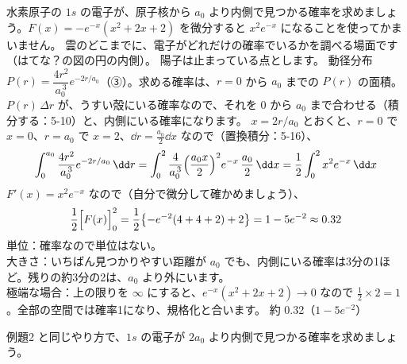\label{ph:原-7:ex2}
\begin{phreidai}
水素原子の $1s$ の電子が、原子核から $a_0$ より内側で見つかる確率を求めましょう。$F(x)=-e^{-x}(x^2+2x+2)$ を微分すると $x^2e^{-x}$ になることを使ってかまいません。
\phbamen
雲のどこまでに、電子がどれだけの確率でいるかを調べる場面です（はてな？の図の円の内側）。
\phmushi
陽子は止まっている点とします。
\phzu
動径分布 $P(r)=\dfrac{4r^2}{a_0^{\,3}}e^{-2r/a_0}$（③）。求める確率は、$r=0$ から $a_0$ までの $P(r)$ の面積。
\phriyu
$P(r)\,\Delta r$ が、うすい殻にいる確率なので、それを $0$ から $a_0$ まで合わせる（積分する：5-10）と、内側にいる確率になります。
\phtateru
$x=2r/a_0$ とおくと、$r=0$ で $x=0$、$r=a_0$ で $x=2$、$\dd r=\tfrac{a_0}{2}\dd x$ なので（置換積分：5-16）、
\[ \int_0^{a_0}\frac{4r^2}{a_0^{\,3}}e^{-2r/a_0}\,\dd r=\int_0^{2}\frac{4}{a_0^{\,3}}\Bigl(\frac{a_0x}{2}\Bigr)^2e^{-x}\,\frac{a_0}{2}\,\dd x=\frac12\int_0^2x^2e^{-x}\,\dd x \]
\phtoku
$F'(x)=x^2e^{-x}$ なので（自分で微分して確かめましょう）、
\[ \frac12\Bigl[F(x)\Bigr]_0^2=\frac12\bigl\{-e^{-2}(4+4+2)+2\bigr\}=1-5e^{-2}\approx0.32 \]
\phtashikame
単位：確率なので単位はない。\\
大きさ：いちばん見つかりやすい距離が $a_0$ でも、内側にいる確率は3分の1ほど。残りの約3分の2は、$a_0$ より外にいます。\\
極端な場合：上の限りを $\infty$ にすると、$e^{-x}(x^2+2x+2)\to0$ なので $\tfrac12\times2=1$。全部の空間では確率1になり、規格化と合います。
\kotae 約 0.32（$1-5e^{-2}$）
\end{phreidai}
\begin{jibun}
例題2 と同じやり方で、$1s$ の電子が $2a_0$ より内側で見つかる確率を求めましょう。
\end{jibun}

